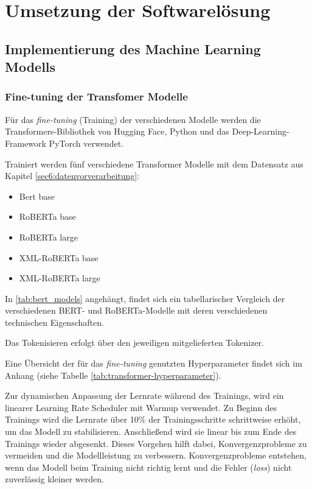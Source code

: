 \chapter{Umsetzung der Softwarelösung}
\label{chap:umsetzung_des_prototyps}

\section{Implementierung des Machine Learning Modells}

\subsection{Fine-tuning der Transfomer Modelle}

Für das \textit{fine-tuning} (Training) der verschiedenen Modelle werden die Transformers-Bibliothek von Hugging Face, Python und das Deep-Learning-Framework PyTorch verwendet.

Trainiert werden fünf verschiedene Transformer Modelle mit dem Datensatz aus Kapitel \ref{sec6:datenvorverarbeitung}:
\begin{itemize}
    \item Bert base
    \item RoBERTa base
    \item RoBERTa large
    \item XML-RoBERTa base
    \item XML-RoBERTa large
\end{itemize}

In \ref{tab:bert_models} angehängt, findet sich ein tabellarischer Vergleich der verschiedenen BERT- und RoBERTa-Modelle mit deren verschiedenen technischen Eigenschaften.

Das Tokenisieren erfolgt über den jeweiligen mitgelieferten Tokenizer.

Eine Übersicht der für das \textit{fine-tuning} genutzten Hyperparameter findet sich im Anhang (siehe Tabelle \ref{tab:transformer-hyperparameter}).

Zur dynamischen Anpassung der Lernrate während des Trainings, wird ein linearer Learning Rate Scheduler mit Warmup verwendet.
Zu Beginn des Trainings wird die Lernrate über 10\% der Trainingsschritte schrittweise erhöht, um das Modell zu stabilisieren. 
Anschließend wird sie linear bis zum Ende des Trainings wieder abgesenkt. Dieses Vorgehen hilft dabei, Konvergenzprobleme zu vermeiden und die Modellleistung zu verbessern.
Konvergenzprobleme entstehen, wenn das Modell beim Training nicht richtig lernt und die Fehler (\textit{loss}) nicht zuverlässig kleiner werden.

